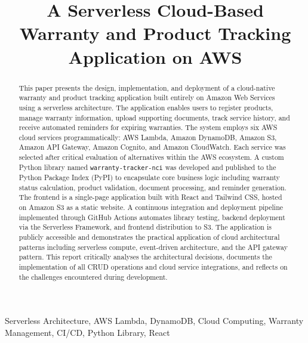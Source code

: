 \documentclass[conference]{IEEEtran}
\begin{document}
\title{A Serverless Cloud-Based Warranty and Product Tracking Application on AWS}

\author{
}

\maketitle

\begin{abstract}
This paper presents the design, implementation, and deployment of a cloud-native warranty and product tracking application built entirely on Amazon Web Services using a serverless architecture. The application enables users to register products, manage warranty information, upload supporting documents, track service history, and receive automated reminders for expiring warranties. The system employs six AWS cloud services programmatically: AWS Lambda, Amazon DynamoDB, Amazon S3, Amazon API Gateway, Amazon Cognito, and Amazon CloudWatch. Each service was selected after critical evaluation of alternatives within the AWS ecosystem. A custom Python library named \texttt{warranty-tracker-nci} was developed and published to the Python Package Index (PyPI) to encapsulate core business logic including warranty status calculation, product validation, document processing, and reminder generation. The frontend is a single-page application built with React and Tailwind CSS, hosted on Amazon S3 as a static website. A continuous integration and deployment pipeline implemented through GitHub Actions automates library testing, backend deployment via the Serverless Framework, and frontend distribution to S3. The application is publicly accessible and demonstrates the practical application of cloud architectural patterns including serverless compute, event-driven architecture, and the API gateway pattern. This report critically analyses the architectural decisions, documents the implementation of all CRUD operations and cloud service integrations, and reflects on the challenges encountered during development.
\end{abstract}

\begin{IEEEkeywords}
Serverless Architecture, AWS Lambda, DynamoDB, Cloud Computing, Warranty Management, CI/CD, Python Library, React
\end{IEEEkeywords}
\end{document}
